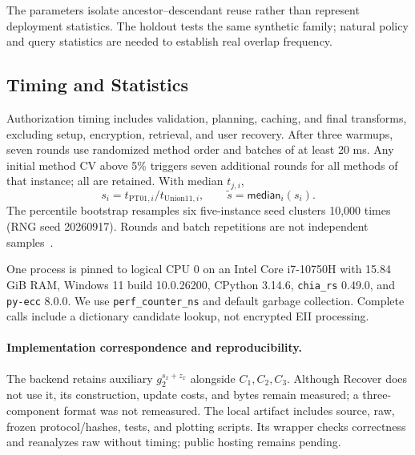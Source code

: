 \documentclass[runningheads]{llncs}
\newif\ifmarkrevisions
\newenvironment{revision}{\par\begingroup\ifmarkrevisions\color{RevisionBlue}\fi}{\par\endgroup}
\begin{document}
\begin{revision}
The parameters isolate ancestor--descendant reuse rather than represent
deployment statistics. The holdout tests the same synthetic family; natural
policy and query statistics are needed to establish real overlap frequency.

\subsection{Timing and Statistics}
Authorization timing includes validation, planning, caching, and final
transforms, excluding setup, encryption, retrieval, and user recovery.
After three warmups, seven rounds use randomized method order and batches
of at least 20 ms. Any initial method CV above 5\% triggers seven additional
rounds for all methods of that instance; all are retained. With median $t_{j,i}$,
\[
 s_i=t_{\mathrm{PT01},i}/t_{\mathrm{Union11},i},\qquad
 \widetilde{s}=\mathsf{median}_i(s_i).
\]
The percentile bootstrap resamples six five-instance seed clusters 10,000
times (RNG seed 20260917). Rounds and batch repetitions are not independent
samples~\cite{Kalibera2013Benchmarking}.

One process is pinned to logical CPU 0 on an Intel Core i7-10750H with
15.84 GiB RAM, Windows 11 build 10.0.26200, CPython 3.14.6,
\texttt{chia\_rs} 0.49.0, and \texttt{py-ecc} 8.0.0. We use
\texttt{perf\_counter\_ns} and default garbage collection. Complete calls
include a dictionary candidate lookup, not encrypted EII processing.

\paragraph{Implementation correspondence and reproducibility.}
The backend retains auxiliary $g_2^{s_x+z_x}$ alongside $C_1,C_2,C_3$.
Although Recover does not use it, its construction, update costs, and bytes
remain measured; a three-component format was not remeasured. The local
artifact includes source, raw, frozen protocol/hashes, tests, and plotting
scripts. Its wrapper checks correctness and reanalyzes raw without timing;
public hosting remains pending.
\end{revision}
\end{document}

